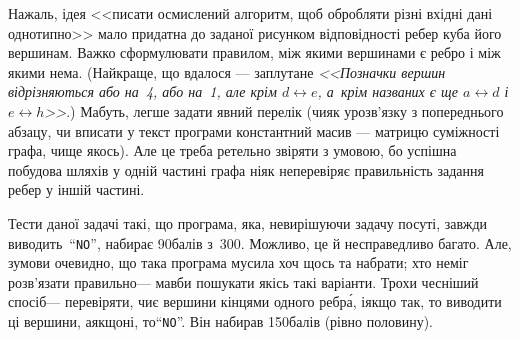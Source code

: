На\nolinebreak[3] жаль, ідея <<писати осмислений алгоритм, щоб обробляти різні вхідні дані однотипно>> мало придатна до заданої рисунком відповідності ребер куба його вершинам. Важко сформулювати правилом, між якими вершинами є ребро і між якими нема. (Найкраще, що вдалося --- заплутане \textsl{<<Позначки вершин відрізняються або на~4, або на~1, але крім $d{\leftrightarrow}e$, а~крім названих є ще $a{\leftrightarrow}d$ і\nolinebreak[3] $e{\leftrightarrow}h$>>}.) Мабуть, легше задати явний перелік (чи\nolinebreak[3] як у\nolinebreak[3] розв'язку з попереднього абзацу, чи вписати у текст програми константний масив --- матрицю суміжності графа, чи\nolinebreak[2] ще якось). Але це треба ретельно звіряти з умовою, бо успішна побудова шляхів у одній частині графа ніяк не\nolinebreak[3] перевіряє правильність задання ребер у іншій частині. 

\label{text:log-cube-how-to-get-part-of-points-easily}
Тести даної задачі такі, що програма, яка, не\nolinebreak[3] вирішуючи задачу по\nolinebreak[3] суті, завжди виводить~``\texttt{NO}'', набирає 90\nolinebreak[3] балів з~300. Можливо, це й несправедливо багато. Але, з\nolinebreak[3] умови очевидно, що така програма мусила хоч щось та набрати; хто не\nolinebreak[3] міг розв'язати правильно\nolinebreak[3] --- мав\nolinebreak[3] би пошукати якісь такі варіанти.
Трохи чесніший спосіб\nolinebreak[3] --- перевіряти, чи\nolinebreak[3] є вершини кінцями одного ребр\'{а}, і\nolinebreak[3] якщо так, то виводити ці вершини, а\nolinebreak[3] якщо\nolinebreak[3] ні, то\nolinebreak[3] ``\texttt{NO}''. Він набирав 150\nolinebreak[3] балів (рівно половину).